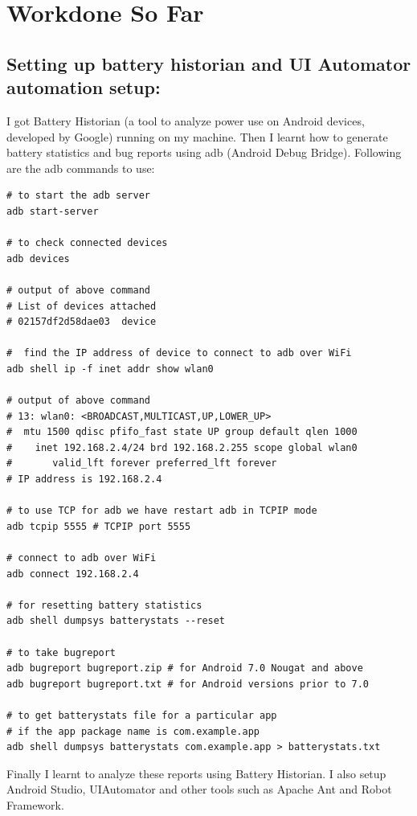 \setlength\parindent{0pt}

\chapter{Workdone So Far}

\section{Setting up battery historian and UI Automator automation setup:} I got Battery Historian (a tool to analyze power use on Android devices, developed by Google) running on my machine. Then I learnt how to generate battery statistics and bug reports using adb (Android Debug Bridge). Following are the adb commands to use:\cite{adb}
\begin{lstlisting}[style=ShellStyle]
# to start the adb server
adb start-server

# to check connected devices
adb devices

# output of above command
# List of devices attached
# 02157df2d58dae03	device

#  find the IP address of device to connect to adb over WiFi
adb shell ip -f inet addr show wlan0

# output of above command
# 13: wlan0: <BROADCAST,MULTICAST,UP,LOWER_UP> 
#  mtu 1500 qdisc pfifo_fast state UP group default qlen 1000
#    inet 192.168.2.4/24 brd 192.168.2.255 scope global wlan0
#       valid_lft forever preferred_lft forever
# IP address is 192.168.2.4

# to use TCP for adb we have restart adb in TCPIP mode
adb tcpip 5555 # TCPIP port 5555

# connect to adb over WiFi
adb connect 192.168.2.4

# for resetting battery statistics
adb shell dumpsys batterystats --reset

# to take bugreport
adb bugreport bugreport.zip # for Android 7.0 Nougat and above
adb bugreport bugreport.txt # for Android versions prior to 7.0 

# to get batterystats file for a particular app 
# if the app package name is com.example.app
adb shell dumpsys batterystats com.example.app > batterystats.txt
\end{lstlisting}
Finally I learnt to analyze these reports using Battery Historian. I also setup Android Studio, UIAutomator and other tools such as Apache Ant and Robot Framework.
\\

